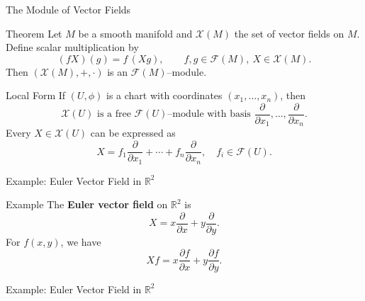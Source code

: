 \begin{frame}{The Module of Vector Fields}
\vspace{-0.3cm}
\begin{block}{Theorem}
Let $M$ be a smooth manifold and $\mathcal{X}(M)$ the set of vector fields on $M$.
Define scalar multiplication by
\vspace{-0.2cm}
\[
(fX)(g)=f\,(Xg), \qquad f,g\in\mathcal{F}(M),\ X\in\mathcal{X}(M).
\]
Then $(\mathcal{X}(M),+,\cdot)$ is an $\mathcal{F}(M)$–module.
\end{block}
\vspace{-0.3cm}
\begin{block}{Local Form}
If $(U,\phi)$ is a chart with coordinates $(x_1,\dots,x_n)$, then
\vspace{-0.2cm}
\[
\mathcal{X}(U)\text{ is a free $\mathcal{F}(U)$–module with basis }
\frac{\partial}{\partial x_1},\dots,\frac{\partial}{\partial x_n}.
\]
Every $X\in\mathcal{X}(U)$ can be expressed as
\vspace{-0.2cm}
\[
X=f_1\frac{\partial}{\partial x_1}+\cdots+f_n\frac{\partial}{\partial x_n}, \quad f_i\in\mathcal{F}(U).
\]
\vspace{-0.5cm}
\end{block}
\end{frame}


\begin{frame}{Example: Euler Vector Field in $\mathbb{R}^2$}
\begin{block}{Example}
The \textbf{Euler vector field} on $\mathbb{R}^2$ is
\[
X = x\frac{\partial}{\partial x} + y\frac{\partial}{\partial y}.
\]
For $f(x,y)$, we have
\[
Xf = x\frac{\partial f}{\partial x} + y\frac{\partial f}{\partial y}.
\]
\end{block}
\end{frame}

\begin{frame}{Example: Euler Vector Field in $\mathbb{R}^2$}
\begin{block}{}
\begin{center}
\end{center}
\end{block}
\end{frame}

